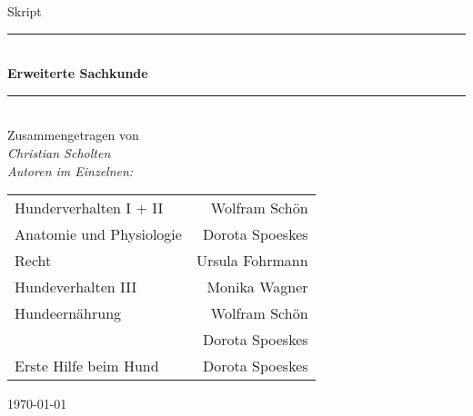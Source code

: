 \begin{titlepage}
\begin{center}
    \Large Skript\\
    \rule{\linewidth}{0.5mm} \\
    { \huge \bfseries Erweiterte Sachkunde}\\
    \rule{\linewidth}{0.5mm} \\
    Zusammengetragen von \\
    \emph{Christian Scholten} \\
    \vspace{5em}
    \emph{Autoren im Einzelnen:} \\
    \vspace{1em}
    \begin{tabular}{lr}
            Hunderverhalten I + II      & Wolfram Schön \\
            Anatomie und Physiologie    & Dorota Spoeskes \\
            Recht                       & Ursula Fohrmann \\
            Hundeverhalten III          & Monika Wagner \\
            Hundeernährung              & Wolfram Schön \\
                                        & Dorota Spoeskes \\
            Erste Hilfe beim Hund       & Dorota Spoeskes \\
    \end{tabular}
    \vfill
    {\large \today}

\end{center}
\end{titlepage}